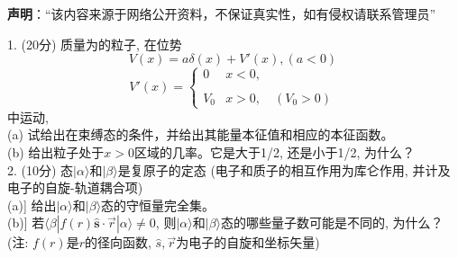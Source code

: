 
\textbf{声明}：“该内容来源于网络公开资料，不保证真实性，如有侵权请联系管理员”

1. (20分) 质量为的粒子, 在位势
$$V(x) = a \delta (x) + V'(x), (a < 0)~$$
$$V'(x) = \begin{cases} 0 & x < 0, \\\\ V_0 & x > 0,\quad (V_0 > 0)\end{cases}~$$
中运动,\\
(a) 试给出在束缚态的条件，并给出其能量本征值和相应的本征函数。\\
(b) 给出粒子处于$ x > 0 $区域的几率。它是大于1/2, 还是小于1/2, 为什么？\\

2. (10分) 态$|\alpha\rangle$和$|\beta\rangle$是复原子的定态 (电子和质子的相互作用为库仑作用, 并计及电子的自旋-轨道耦合项)\\
(a)] 给出$|\alpha\rangle$和$|\beta\rangle$态的守恒量完全集。\\
(b)] 若$\langle \beta | f({r}) \hat{\mathbf{s}} \cdot \vec{r} | \alpha \rangle \neq 0$, 则$|\alpha\rangle$和$|\beta\rangle$态的哪些量子数可能是不同的, 为什么？\\
(注: $f({r})$是$r$的径向函数, $\hat{s},\vec{r}$为电子的自旋和坐标矢量)\\
